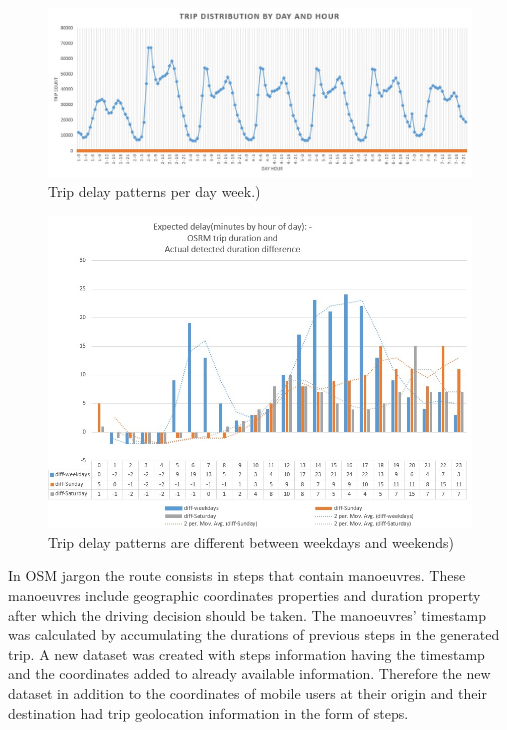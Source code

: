 \documentclass[12pt, a4paper]{report}
\theoremstyle{definition}
\theoremstyle{definition}%
\theoremstyle{definition}%
\theoremstyle{definition}%
\theoremstyle{definition}%
\theoremstyle{definition}%
\begin{document}
\begin{figure}[h]	
	\includegraphics[scale=0.50]{Trip_delay_per_day_week.jpg}
	\centering
	\caption{Trip delay patterns per day week.)}
	\label{fig:trip_delay_per_day_week}
\end{figure}

\begin{figure}[h]	
	\includegraphics[scale=0.60]{Trip_delay.jpg}
	\centering
	\caption{Trip delay patterns are different between weekdays and weekends)}
	\label{fig:trip_delay_weekdays_vs_weekends}
\end{figure}



In OSM jargon the route consists in steps that contain manoeuvres. These manoeuvres include geographic coordinates properties and duration property after which the driving decision should be taken. The manoeuvres' timestamp was calculated by accumulating the durations of previous steps in the generated trip. A new dataset was created with steps information having the timestamp and the coordinates added to already available information. Therefore the new dataset in addition to the coordinates of mobile users at their origin and their destination had trip geolocation information in the form of steps.
 
\end{document}
